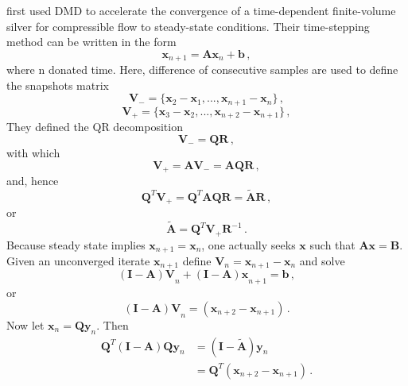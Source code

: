 \citet{andersson_novel} first used DMD to accelerate the convergence of a time-dependent finite-volume silver for compressible flow to steady-state conditions.
Their time-stepping method can be written in the form 
\begin{equation}
 \mathbf{x}_{n+1} = \mathbf{Ax}_n + \mathbf{b} \, ,
 \label{eq:andersson_1}
\end{equation}
where n donated time. Here, difference of consecutive samples are used to define the snapshots matrix 
\begin{equation}
 \mathbf{V}_- = \{\mathbf{x}_2-\mathbf{x}_1,..., \mathbf{x}_{n+1}-\mathbf{x}_{n} \} \, ,
 \label{eq:andersson_snapshot-}
\end{equation}
\begin{equation}
 \mathbf{V}_+ = \{\mathbf{x}_3-\mathbf{x}_2,..., \mathbf{x}_{n+2}-\mathbf{x}_{n+1} \} \, ,
 \label{eq:andersson_snapshot+}
\end{equation}
They defined the QR decomposition 
\begin{equation}
 \mathbf{V}_- = \mathbf{QR} \, ,
 \label{eq:andersson_qr}
\end{equation}
with which
\begin{equation}
 \mathbf{V}_+ = \mathbf{AV}_{-} = \mathbf{AQR} \, ,
 \label{eq:andersson_av}
\end{equation}
and, hence
\begin{equation}
 \mathbf{Q}^{T} \mathbf{V}_{+} = \mathbf{Q}^{T} \mathbf{AQR} = \mathbf{\tilde{A}R} \, ,
 \label{eq:andersson_qv1}
\end{equation}
or
\begin{equation}
 \mathbf{\tilde{A}} = \mathbf{Q}^{T}  \mathbf{V}_+ \mathbf{R}^{-1} \, .
 \label{eq:andersson_qv2}
\end{equation}
Because steady state implies $\mathbf{x}_{n+1} = \mathbf{x}_{n}$, one actually seeks $\mathbf{x}$ such that $\mathbf{Ax=B}$.
Given an unconverged iterate $\mathbf{x}_{n+1}$ define $\mathbf{V}_n = \mathbf{x}_{n+1} - \mathbf{x}_{n}$ and solve 
\begin{equation}
 \mathbf{(I-A)V}_n + \mathbf{(I-A)x}_{n+1} = \mathbf{b} \, ,
 \label{eq:andersson_ia1}
\end{equation}
or
\begin{equation}
 \mathbf{(I-A)V}_n = (\mathbf{x}_{n+2} - \mathbf{x}_{n+1}) \, .
 \label{eq:andersson_ia2}
\end{equation}
Now let $\mathbf{x}_n = \mathbf{Q} \mathbf{y}_n$. Then 
\begin{equation}
\begin{split}
   \mathbf{Q}^T \mathbf{(I - A)} \mathbf{Q} \mathbf{y}_n & = \mathbf{(I - \tilde{A})} \mathbf{y}_n\\
   & = \mathbf{Q}^T (\mathbf{x}_{n+2} - \mathbf{x}_{n+1}) \, .
\end{split}
\label{eq:andersson_xy}
\end{equation}
